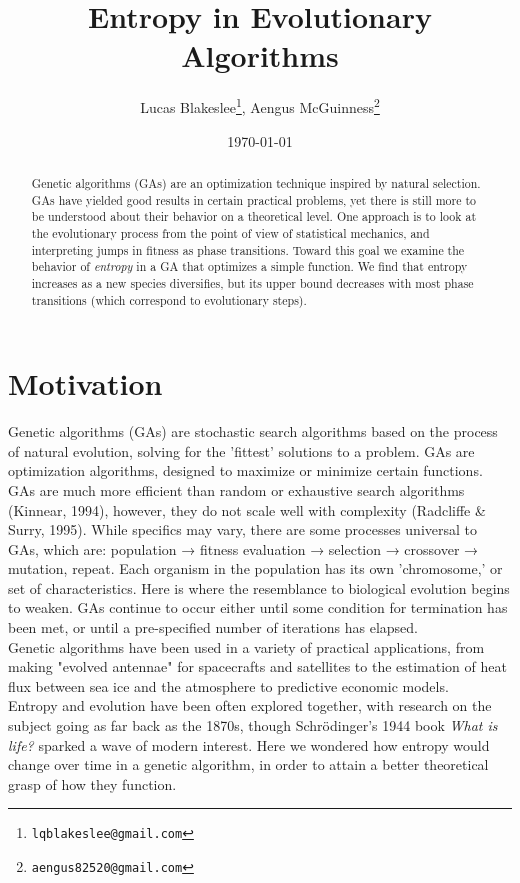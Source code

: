 \documentclass[11pt]{article}
\date{\today}
\title{Entropy in Evolutionary Algorithms}
\author{Lucas Blakeslee\footnote{\texttt{lqblakeslee@gmail.com}},
  Aengus McGuinness\footnote{\texttt{aengus82520@gmail.com}}}
\begin{document}
\maketitle


\label{sec:org26f53e0}
\begin{abstract}
\label{sec:orga17da23}

Genetic algorithms (GAs) are an optimization technique inspired by
natural selection. GAs have yielded good results in certain practical
problems, yet there is still more to be understood about their
behavior on a theoretical level. One approach is to look at the
evolutionary process from the point of view of statistical mechanics,
and interpreting jumps in fitness as phase transitions. Toward this
goal we examine the behavior of \emph{entropy} in a GA that optimizes
a simple function.  We find that entropy increases as a new species
diversifies, but its upper bound decreases with most phase
transitions (which correspond to evolutionary steps).
\end{abstract}




\section{Motivation}
\label{sec:org16abecd}
Genetic algorithms (GAs) are stochastic search algorithms based on the
process of natural evolution, solving for the 'fittest' solutions to a
problem. GAs are optimization algorithms, designed to maximize or
minimize certain functions. GAs are much more efficient than random or
exhaustive search algorithms (Kinnear, 1994), however, they do not
scale well with complexity (Radcliffe \& Surry, 1995). While specifics
may vary, there are some processes universal to GAs, which are:
population → fitness evaluation → selection → crossover → mutation,
repeat. Each organism in the population has its own 'chromosome,' or
set of characteristics. Here is where the resemblance to biological
evolution begins to weaken. GAs continue to occur either
until some condition for termination has been met, or until a
pre-specified number of iterations has elapsed. \\
Genetic algorithms
have been used in a variety of practical applications, from making
"evolved antennae" for spacecrafts and satellites to the estimation of
heat flux between sea ice and the atmosphere to predictive economic
models. \\
Entropy and evolution have been often explored together, with
research on the subject going as far back as the 1870s, though
Schrödinger's 1944 book \emph{What is life?} sparked a wave of modern
interest. Here we wondered how entropy would change over time in a
genetic algorithm, in order to attain a better theoretical grasp of
how they function.
\end{document}
